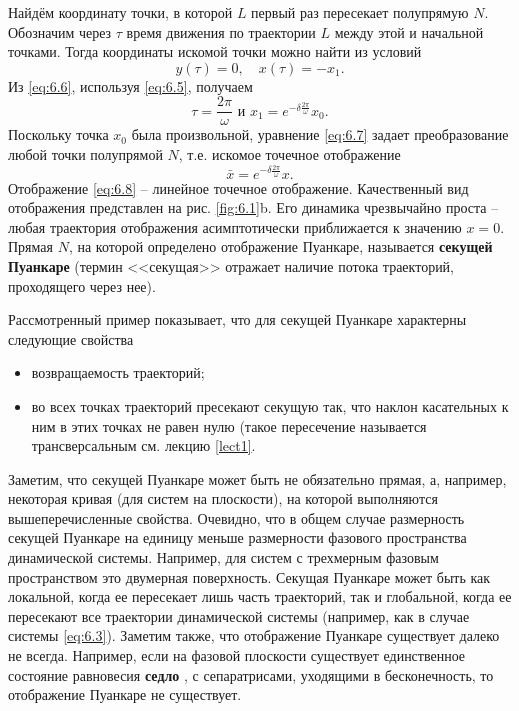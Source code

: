 Найдём координату точки, в которой $L$ первый раз пересекает полупрямую $N$. Обозначим через $\tau$ время движения по траектории $L$ между этой и начальной точками. Тогда координаты искомой точки можно найти из условий
\begin{equation}
        \label{eq:6.6}
        y(\tau) = 0, \quad x(\tau) = - x_1.
\end{equation}
Из \eqref{eq:6.6}, используя \eqref{eq:6.5}, получаем
\begin{equation}
        \label{eq:6.7}
        \tau = \frac{2 \pi}{\omega} \text{ и } x_1 = e^{-\delta \frac{2 \pi}{\omega}} x_0. 
\end{equation}
Поскольку точка $x_0$ была произвольной, уравнение \eqref{eq:6.7} задает преобразование любой точки полупрямой $N$, т.е. искомое точечное отображение
\begin{equation}
        \label{eq:6.8}
        \bar x = e^{- \delta \frac{ 2 \pi}{\omega}} x.
\end{equation}
Отображение \eqref{eq:6.8} – линейное точечное отображение. Качественный вид
отображения представлен на рис. \ref{fig:6.1}b. Его динамика чрезвычайно проста –
любая траектория отображения асимптотически приближается к значению $x=0$.
Прямая $N$, на которой определено отображение Пуанкаре, называется \textbf{секущей
Пуанкаре} (термин <<секущая>> отражает наличие потока траекторий,
проходящего через нее).

Рассмотренный пример показывает, что для секущей Пуанкаре характерны следующие свойства
\begin{itemize}
        \item возвращаемость траекторий;
        \item во всех точках траекторий пресекают секущую так, что наклон касательных к ним в этих точках не равен нулю (такое пересечение называется трансверсальным см. лекцию \ref{lect1}.
\end{itemize}
Заметим, что секущей Пуанкаре может быть не обязательно прямая, а,
например, некоторая кривая (для систем на плоскости), на которой
выполняются вышеперечисленные свойства. Очевидно, что в общем случае
размерность секущей Пуанкаре на единицу меньше размерности фазового
пространства динамической системы. Например, для систем с трехмерным
фазовым пространством это двумерная поверхность. Секущая Пуанкаре может
быть как локальной, когда ее пересекает лишь часть траекторий, так и
глобальной, когда ее пересекают все траектории динамической системы
(например, как в случае системы \eqref{eq:6.3}). Заметим также, что отображение
Пуанкаре существует далеко не всегда. Например, если на фазовой плоскости
существует единственное состояние равновесия \textbf{седло} , с сепаратрисами,
уходящими в бесконечность, то отображение Пуанкаре не существует.

